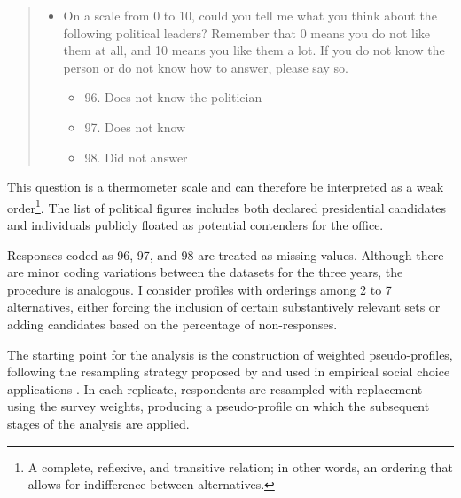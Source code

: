 \documentclass[12pt]{article}
\begin{document}
\begin{quote}
\begin{itemize}
  \item On a scale from 0 to 10, could you tell me what you think about the following political leaders? Remember that 0 means you do not like them at all, and 10 means you like them a lot. If you do not know the person or do not know how to answer, please say so.
    \begin{itemize}
      \item 96. Does not know the politician
      \item 97. Does not know
      \item 98. Did not answer
    \end{itemize}
\end{itemize}
\end{quote}

This question is a thermometer scale and can therefore be interpreted as a weak order\parencite{regenwetter2006behavioral}\footnote{A complete, reflexive, and transitive relation; in other words, an ordering that allows for indifference between alternatives.}. The list of political figures includes both declared presidential candidates and individuals publicly floated as potential contenders for the office.

Responses coded as 96, 97, and 98 are treated as missing values. Although there are minor coding variations between the datasets for the three years, the procedure is analogous. I consider profiles with orderings among 2 to 7 alternatives, either forcing the inclusion of certain substantively relevant sets or adding candidates based on the percentage of non-responses.




The starting point for the analysis is the construction of weighted
pseudo-profiles, following the resampling strategy proposed by
\textcite{popov2014consensus} and used in empirical social choice applications
\parencite{kaminski2015empirical,
lachat24_alter_to_plural_rule_singl_winner_elect, maciel2024bolsonaro}. In each
replicate, respondents are resampled with replacement using the survey weights,
producing a pseudo-profile on which the subsequent stages of the analysis are
applied.
\end{document}
